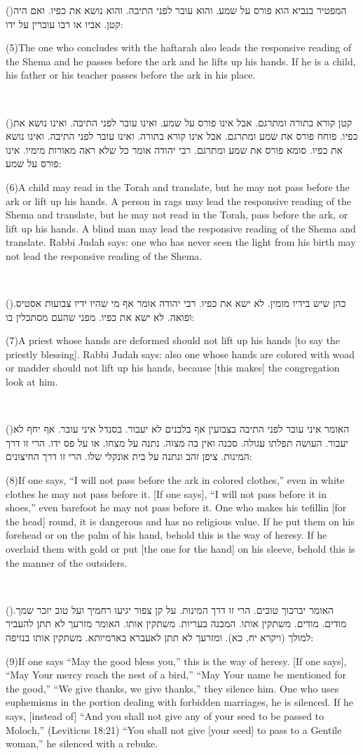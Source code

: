 \documentclass[12pt, openany]{book}
\newcommand{\sethebfont}{
\fontsize{10.5pt}{13.1pt} \selectfont
}
\newcommand{\LTRmark}{‎}
\newcommand{\hebeng}[2]{
	{\sethebfont #1}
	
	{\beginL\englishfont\sethebfont{\raggedright #2 \hfill} \LTRmark\endL}
	
	\vspace{\baselineskip}
}
\newcommand{\vsnum}[1]{(\hebrewnumeral{#1})\space}
\newcommand{\vsnumeng}[1]{(#1)\space}
\begin{document}
\hebeng{\vsnum{5}המפטיר בנביא הוא פורס על שמע. והוא עובר לפני התיבה. והוא נושא את כפיו. ואם היה קטן. אביו או רבו עוברין על ידו: }{\vsnumeng{5}The one who concludes with the haftarah also leads the responsive reading of the Shema and he passes before the ark and he lifts up his hands. If he is a child, his father or his teacher passes before the ark in his place.}%

\hebeng{\vsnum{6}קטן קורא בתורה ומתרגם. אבל אינו פורס על שמע. ואינו עובר לפני התיבה. ואינו נושא את כפיו. פוחח פורס את שמע ומתרגם. אבל אינו קורא בתורה. ואינו עובר לפני התיבה. ואינו נושא את כפיו. סומא פורס את שמע ומתרגם. רבי יהודה אומר כל שלא ראה מאורות מימיו. אינו פורס על שמע: }{\vsnumeng{6}A child may read in the Torah and translate, but he may not pass before the ark or lift up his hands. A person in rags may lead the responsive reading of the Shema and translate, but he may not read in the Torah, pass before the ark, or lift up his hands. A blind man may lead the responsive reading of the Shema and translate. Rabbi Judah says: one who has never seen the light from his birth may not lead the responsive reading of the Shema.}%

\hebeng{\vsnum{7}כהן שיש בידיו מומין. לא ישא את כפיו. רבי יהודה אומר אף מי שהיו ידיו צבועות אסטיס. ופואה. לא ישא את כפיו. מפני שהעם מסתכלין בו: }{\vsnumeng{7}A priest whose hands are deformed should not lift up his hands {[to say the priestly blessing]}. Rabbi Judah says: also one whose hands are colored with woad or madder should not lift up his hands, because {[this makes]} the congregation look at him.}%

\hebeng{\vsnum{8}האומר איני עובר לפני התיבה בצבועין אף בלבנים לא יעבור. בסנדל איני עובר. אף יחף לא יעבור. העושה תפלתו עגולה. סכנה ואין בה מצוה. נתנה על מצחו. או על פס ידו. הרי זו דרך המינות. ציפן זהב ונתנה על בית אונקלי שלו. הרי זו דרך החיצונים: }{\vsnumeng{8}If one says, “I will not pass before the ark in colored clothes,” even in white clothes he may not pass before it. {[If one says]}, “I will not pass before it in shoes,” even barefoot he may not pass before it. One who makes his tefillin {[for the head]} round, it is dangerous and has no religious value. If he put them on his forehead or on the palm of his hand, behold this is the way of heresy. If he overlaid them with gold or put {[the one for the hand]} on his sleeve, behold this is the manner of the outsiders.}%

\hebeng{\vsnum{9}האומר יברכוך טובים. הרי זו דרך המינות. על קן צפור יגיעו רחמיך ועל טוב יזכר שמך. מודים. מודים. משתקין אותו. המכנה בעריות. משתקין אותו. האומר מזרעך לא תתן להעביר למולך (ויקרא יח, כא). ומזרעך לא תתן לאעברא בארמיותא. משתקין אותו בנזיפה: }{\vsnumeng{9}If one says “May the good bless you,” this is the way of heresy. {[If one says]}, “May Your mercy reach the nest of a bird,” “May Your name be mentioned for the good,” “We give thanks, we give thanks,” they silence him. One who uses euphemisms in the portion dealing with forbidden marriages, he is silenced. If he says, {[instead of]} “And you shall not give any of your seed to be passed to Moloch,” (Leviticus 18:21) “You shall not give {[your seed]} to pass to a Gentile woman,” he silenced with a rebuke.}%
\end{document}
